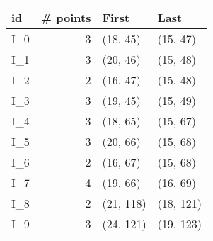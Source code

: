 \begin{tabular}{lrll}
\toprule
   id &  \# points &      First &       Last \\
\midrule
 I\_0 &          3 &   (18, 45) &   (15, 47) \\
 I\_1 &          3 &   (20, 46) &   (15, 48) \\
 I\_2 &          2 &   (16, 47) &   (15, 48) \\
 I\_3 &          3 &   (19, 45) &   (15, 49) \\
 I\_4 &          3 &   (18, 65) &   (15, 67) \\
 I\_5 &          3 &   (20, 66) &   (15, 68) \\
 I\_6 &          2 &   (16, 67) &   (15, 68) \\
 I\_7 &          4 &   (19, 66) &   (16, 69) \\
 I\_8 &          2 &  (21, 118) &  (18, 121) \\
 I\_9 &          3 &  (24, 121) &  (19, 123) \\
\bottomrule
\end{tabular}
